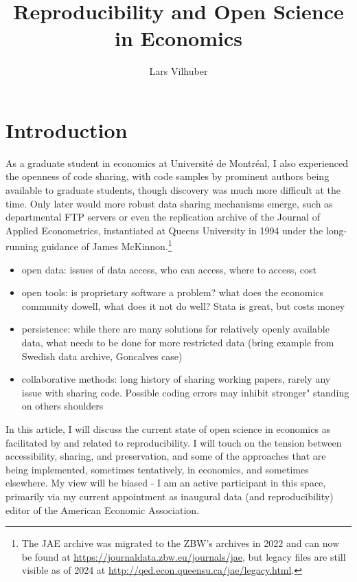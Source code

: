 \documentclass{article}
\author[1]{Lars Vilhuber}
\affil[1]{Cornell University}
\title{Reproducibility and Open Science in Economics}
\begin{document}
\maketitle

\section{Introduction}


As a graduate student in economics at Université de Montréal, I also experienced the openness of code sharing, with code samples by prominent authors being available to graduate students, though discovery was much more difficult at the time. Only later would more robust data sharing mechanisms emerge, such as departmental FTP servers or even the replication archive of the Journal of Applied Econometrics, instantiated at Queens University in 1994 under the long-running guidance of James McKinnon.\footnote{The JAE archive was migrated to the ZBW's archives in 2022 and can now be found at \url{https://journaldata.zbw.eu/journals/jae}, but legacy files are still visible as of 2024 at \url{http://qed.econ.queensu.ca/jae/legacy.html}.}


\begin{itemize}
\item open data: issues of data access, who can access, where to access, cost
\item open tools: is proprietary software a problem? what does the economics community dowell, what does it not do well? Stata is great, but costs money
\item persistence: while there are many solutions for relatively openly available data, what needs to be done for more restricted data (bring example from Swedish data archive, Goncalves case)
\item collaborative methods: long history of sharing working papers, rarely any issue with sharing code. Possible coding errors may inhibit stronger" standing on others shoulders
\end{itemize}

In this article, I will discuss the current state of open science in economics as facilitated by and related to reproducibility. I will touch on the tension between accessibility, sharing, and preservation, and some of the approaches that are being implemented, sometimes tentatively, in economics, and sometimes elsewhere. My view will be biased - I am an active participant in this space, primarily via my current appointment as inaugural data (and reproducibility) editor of the American Economic Association.
\end{document}
